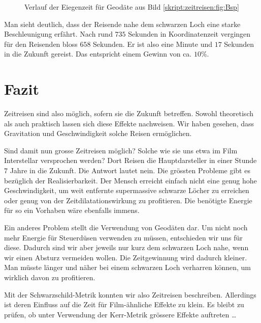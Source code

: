 \begin{refsection}
\begin{figure}
        \caption{Verlauf der Eiegenzeit für Geodäte aus Bild \ref{skript:zeitreisen:fig:Bsp} }
        \label{skript:zeitreisen:fig:Bsp_time} 
    \end{figure}
    Man sieht deutlich, dass der Reisende nahe dem schwarzen Loch eine starke Beschleunigung erfährt. Nach rund $735$ Sekunden in Koordinatenzeit vergingen für den Reisenden bloss $658$ Sekunden. Er ist also eine Minute und $17$ Sekunden in die Zukunft gereist. Das entspricht einem Gewinn von ca. $10\%$.
    
   	\section{Fazit}
    
    Zeitreisen sind also möglich, sofern sie die Zukunft betreffen. Sowohl theoretisch als auch praktisch lassen sich diese Effekte nachweisen. Wir haben gesehen, dass Gravitation und Geschwindigkeit solche Reisen ermöglichen.
    
    Sind damit nun grosse Zeitreisen möglich? Solche wie sie uns etwa im Film Interstellar versprochen werden? Dort Reisen die Hauptdarsteller in einer Stunde $7$ Jahre in die Zukunft. Die Antwort lautet nein. Die grössten Probleme gibt es bezüglich der Realisierbarkeit. Der Mensch erreicht einfach nicht eine genug hohe Geschwindigkeit, um weit entfernte supermassive schwarze Löcher zu erreichen oder genug von der Zeitdilatationswirkung zu profitieren. Die benötigte Energie für so ein Vorhaben wäre ebenfalls immens.
    
    Ein anderes Problem stellt die Verwendung von Geodäten dar. Um nicht noch mehr Energie für Steuerdüsen verwenden zu müssen, entschieden wir uns für diese. Dadurch sind wir aber jeweils nur kurz dem schwarzen Loch nahe, wenn wir einen Absturz vermeiden wollen. Die Zeitgewinnung wird dadurch kleiner. Man müsste länger und näher bei einem schwarzen Loch verharren können, um wirklich davon zu profitieren. 
    
    Mit der Schwarzschild-Metrik konnten wir also Zeitreisen beschreiben. Allerdings ist deren Einfluss auf die Zeit für Film-ähnliche Effekte zu klein. Es bleibt zu prüfen, ob unter Verwendung der Kerr-Metrik grössere Effekte auftreten \dots
        
	\printbibliography[heading=subbibliography]
	\end{refsection}

